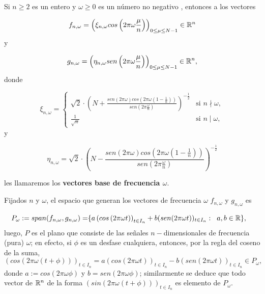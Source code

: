 \begin{defi}
Si $n \geq 2$ es un entero y $\omega \geq 0$ es un número no negativo
, entonces a los vectores

	\begin{equation}
	\label{eq5: 19Marzo}
	f_{n, \omega}= \left( \xi_{n, \omega} cos \left(2 \pi \omega \frac{\mu }{n} \right) \right)_{0 \leq \mu \leq N-1}
	\in \mathbb{R}^{n}
	\end{equation}
y 

	\begin{equation}
	\label{eq6: 19Marzo}
	g_{n, \omega}= \left( \eta_{n, \omega} sen \left(2 \pi \omega \frac{\mu }{n}\right) \right)_{0 \leq \mu \leq N-1}
	\in \mathbb{R}^{n},
	\end{equation}
donde

\begin{equation}
\label{eq7: 19Marzo}
\xi_{n, \omega}= 
\left\{
	\begin{array}{ll}
		\sqrt{2} \cdot \left( N + \frac{sen(2 \pi \omega)
	cos(2 \pi \omega \left( 1- \frac{1}{n} \right))}{sen \left(2 \pi 
	\frac{\omega}{n} \right)} \right)^{-\frac{1}{2}}  & \mbox{si } n \nmid \omega,  \\
		\frac{1}{\sqrt{n}} & \mbox{si } n \mid \omega,
	\end{array}
\right.
\end{equation}
y

	\begin{equation}
	\label{eq8: 19Marzo}
	\eta_{n, \omega}= \sqrt{2} \cdot \left( N - \frac{sen(2 \pi \omega)
	cos(2 \pi \omega \left( 1- \frac{1}{n} \right))}{sen \left(2 \pi 
	\frac{\omega}{n} \right)} \right)^{-\frac{1}{2}}
	\end{equation}

\noindent	
les llamaremos los \textbf{vectores base de frecuencia $\omega$}.
\end{defi}

Fijados $n$ y $\omega$,
el espacio que generan los vectores de frecuencia $\omega$
$f_{n, \omega}$ y $g_{n, \omega}$ es

\begin{align*}
P_{\omega}:= span(f_{n, \omega}, g_{n, \omega}) = & 
\{ a \left( cos \left(2 \pi \omega t \right) \right)_{t \in I_{n}} +
b ( sen (2 \pi \omega t ))_{t \in I_{n}} : 
\hspace{0.2cm} a, b \in \mathbb{R} \},
\end{align*}
luego, $P$ es el plano que consiste de las señales
$n-$dimensionales de frecuencia (pura) $\omega$;
en efecto, si $\phi$ es un desfase cualquiera, entonces,
por la regla del coseno de la suma,
\[
(cos (2 \pi \omega (t + \phi)))_{t \in I_{n}}
= a  (cos(2 \pi \omega t))_{t \in I_{n}} -
b  (sen(2 \pi \omega t))_{t \in I_{n}} \in P_{\omega},
\]
donde
$a:= cos(2 \pi \omega \phi)$ y $b= sen(2 \pi \omega \phi)$;
similarmente se deduce que todo vector de $\mathbb{R}^{n}$ 
de la forma $(sin (2 \pi \omega (t + \phi)))_{t \in I_{n}}$
es elemento de $P_{\omega}$.



